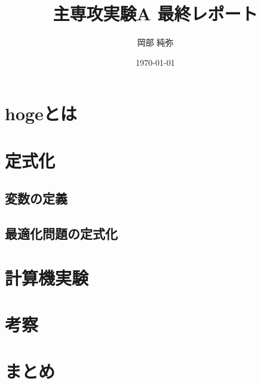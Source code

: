 \documentclass[a4j, dvipdfmx]{jsarticle}
\title{主専攻実験A 最終レポート}
\author{岡部 純弥}
\date{\today}
\begin{document}
\maketitle
\begin{abstract}
  
\end{abstract}
\section{hogeとは}
\subsection{}
\section{定式化}
\subsection{変数の定義}
\subsection{最適化問題の定式化}
\section{計算機実験}
\section{考察}
\section{まとめ}
\end{document}
